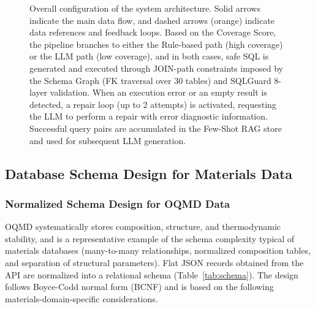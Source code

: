 \documentclass[5p,twocolumn]{elsarticle}
\begin{document}
\begin{figure}[htbp]
{%
}%
\caption{Overall configuration of the system architecture.
  Solid arrows indicate the main data flow, and dashed arrows (orange) indicate data references and feedback loops.
  Based on the Coverage Score, the pipeline branches to either the Rule-based path (high coverage) or the LLM path (low coverage),
  and in both cases, safe SQL is generated and executed through JOIN-path constraints imposed by the
  Schema Graph (FK traversal over 30 tables) and
  SQLGuard 8-layer validation.
  When an execution error or an empty result is detected,
  a repair loop (up to 2 attempts) is activated, requesting the LLM to perform a repair with error diagnostic information.
  Successful query pairs are accumulated in the Few-Shot RAG store and used for subsequent LLM generation.}
\label{fig:architecture}
\end{figure}

\subsection{Database Schema Design for Materials Data}
\label{sec:schema_design}

\subsubsection{Normalized Schema Design for OQMD Data}

OQMD systematically stores composition, structure, and thermodynamic stability,
and is a representative example of the schema complexity typical of materials databases
(many-to-many relationships, normalized composition tables,
and separation of structural parameters).
Flat JSON records obtained from the API are normalized into a relational schema
(Table~\ref{tab:schema}).
The design follows Boyce-Codd normal form (BCNF) and is based on the following materials-domain-specific considerations.
\end{document}
